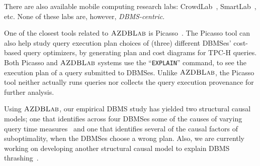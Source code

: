 \documentclass{vldb}
\def\azdb{\hbox{\sc AZDBLab}}
\begin{document}
There are also available \hbox{mobile} computing research labs: \hbox{CrowdLab}~\cite{cuervo2011crowdlab}, \hbox{SmartLab}~\cite{Larkou13SmartLab},  etc. %
None of these labs are, however, \hbox{{\em DBMS-centric}}.

One of the closest tools related to $\azdb$ is Picasso~\cite{Reddy05}.
The Picasso tool can also help study query execution plan choices of (three) 
different \hbox{DBMSes}' cost-based query \linebreak \hbox{optimizers}, by generating plan and cost diagrams for \hbox{TPC-H} queries. 
Both Picasso and $\azdb$ systems use the \linebreak ``{\tt EXPLAIN}'' \hbox{command}, to see the execution plan of a query submitted to \hbox{DBMSes}. 
Unlike $\azdb$, the Picasso tool neither actually runs queries nor collects the query \hbox{execution} provenance for further \hbox{analysis}.

Using $\azdb$, our empirical \hbox{DBMS} study 
has yielded two structural causal models; one that \hbox{identifies} across four \hbox{DBMSes} some of the causes of varying query time \hbox{measures}~\cite{Currim} and one that identifies several of the causal factors of \linebreak \hbox{suboptimality}, when the DBMSes choose a wrong plan. Also, we are currently working on developing another structural causal model to explain DBMS thrashing~\cite{Thomasian93}.


\end{document}
